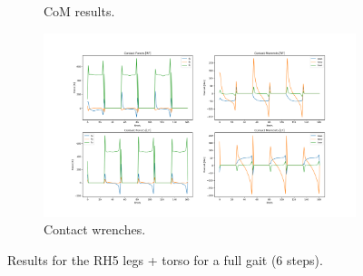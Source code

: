 \begin{figure}[h!]
\begin{subfigure}{.5\textwidth}
\caption{CoM results.}
\end{subfigure}
\begin{subfigure}{.5\textwidth}
  \centering
\includegraphics[width=1\linewidth]{Media/Crocoddyl/RH5Torso/RH5TorsoGait_ContactWrenches.png}
\caption{Contact wrenches.}
\end{subfigure}
\caption{Results for the RH5 legs + torso for a full gait (6 steps).}
\label{fig:rh5Torso_full_gait}
\centering
\end{figure}

